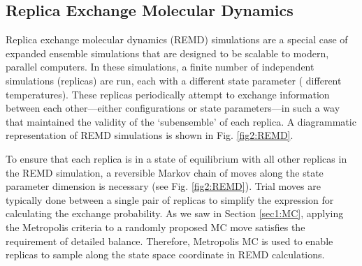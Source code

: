 \subsection{Replica Exchange Molecular Dynamics}

Replica exchange molecular dynamics (REMD) simulations are a special case of
expanded ensemble simulations that are designed to be scalable to modern,
parallel computers. In these simulations, a finite number of independent
simulations (replicas) are run, each with a different state parameter (\eg
different temperatures). These replicas periodically attempt to exchange
information between each other---either configurations or state parameters---in
such a way that maintained the validity of the `subensemble' of each replica. A
diagrammatic representation of REMD simulations is shown in Fig.
\ref{fig2:REMD}. \cite{Sugita_ChemPhysLett_1999_v314_p141}

To ensure that each replica is in a state of equilibrium with all other replicas
in the REMD simulation, a reversible Markov chain of moves along the state
parameter dimension is necessary (see Fig. \ref{fig2:REMD}). Trial moves are
typically done between a single pair of replicas to simplify the expression for
calculating the exchange probability. As we saw in Section \ref{sec1:MC},
applying the Metropolis criteria to a randomly proposed MC move satisfies the
requirement of detailed balance. Therefore, Metropolis MC is used to enable
replicas to sample along the state space coordinate in REMD calculations.

